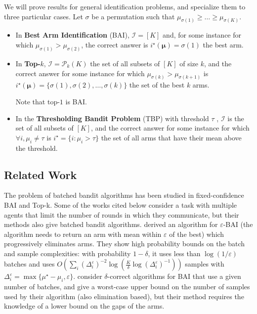 We will prove results for general identification problems, and specialize them to three particular cases.
Let $\sigma$ be a permutation such that $\mu_{\sigma(1)} \ge \ldots \ge \mu_{\sigma(K)}$.
\begin{itemize}
	\item In \textbf{Best Arm Identification} (BAI), $\mathcal{I}=[K]$ and, for some instance for which $\mu_{\sigma(1)}>\mu_{\sigma(2)}$, the correct answer is $i^\star(\bm\mu)=\sigma(1)$ the best arm.
	
	\item In \textbf{Top-$k$}, $\mathcal{I}=\mathcal{P}_k(K)$ the set of all subsets of $[K]$ of size $k$, and the correct answer for some instance for which $\mu_{\sigma(k)}>\mu_{\sigma(k+1)}$ is $i^\star(\bm\mu)=\{\sigma(1),\sigma(2),\dots,\sigma(k)\}$ the set of the best $k$ arms.

	Note that top-$1$ is BAI.
	
	\item In the \textbf{Thresholding Bandit Problem} (TBP) with threshold $\tau$ \citep{locatelliOptimalAlgorithmThresholding2016}, $\mathcal{I}$ is the set of all subsets of $[K]$, and the correct answer for some instance for which $\forall i,\mu_i\neq \tau$ is $i^\star=\{i:\mu_i >\tau\}$ the set of all arms that have their mean above the threshold. 
\end{itemize}




\subsection{Related Work}


The problem of batched bandit algorithms has been studied in fixed-confidence BAI and Top-k. Some of the works cited below consider a task with multiple agents that limit the number of rounds in which they communicate, but their methods also give batched bandit algorithms.
\citet{hillelDistributedExplorationMultiArmed2013} derived an algorithm for $\varepsilon$-BAI (the algorithm needs to return an arm with mean within $\varepsilon$ of the best) which progressively eliminates arms. They show high probability bounds on the batch and sample complexities: with probability $1 - \delta$, it uses less than $\log(1/\varepsilon)$ batches and uses $O\left( \sum_i (\Delta_i^\varepsilon)^{-2} \log\left(\frac{K}{\delta}\log(\Delta_i^\varepsilon)^{-1}\right)\right)$ samples with $\Delta_i^\varepsilon =\max\{\mu^\star - \mu_i,\varepsilon\}$.
\citet{agarwalLearningLimitedRounds2017} consider $\delta$-correct algorithms for BAI that use a given number of batches, and give a worst-case upper bound on the number of samples used by their algorithm (also elimination based), but their method requires the knowledge of a lower bound on the gaps of the arms.

